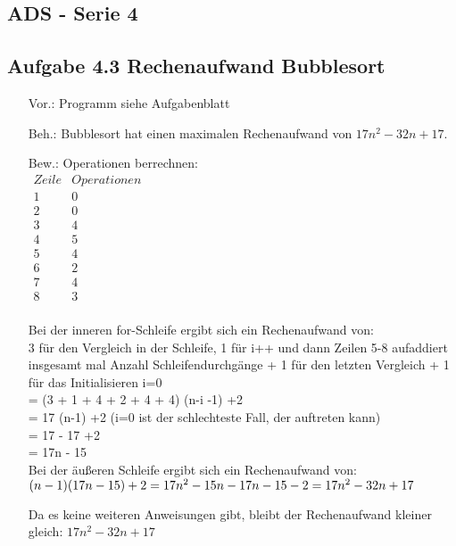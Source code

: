 \documentclass[12pt]{article}
\begin{document}
\subsection*{ADS - Serie 4}
\subsection*{Aufgabe 4.3 Rechenaufwand Bubblesort}
\begin{enumerate}
\item[Vor.:] Programm siehe Aufgabenblatt
\item[Beh.:]  Bubblesort hat einen maximalen Rechenaufwand von $17n^2 - 32n +17$.
\item[Bew.:] Operationen berrechnen:\\
$\begin{array}{l|l}
 Zeile &  Operationen \\
\hline
1 & 0 \\
2 & 0 \\
3 & 4 \\
4 & 5 \\
5 & 4 \\
6 & 2 \\
7 & 4 \\
8 & 3\\
\end{array}$

Bei der inneren for-Schleife ergibt sich ein Rechenaufwand von:\\
3 für den Vergleich in der Schleife, 1 für i++ und dann Zeilen 5-8 aufaddiert insgesamt mal Anzahl Schleifendurchgänge + 1 für den letzten Vergleich + 1 für das Initialisieren i=0\\
= (3 + 1 + 4 + 2 + 4 + 4)  (n-i -1) +2 \\
= 17 (n-1) +2 \quad (i=0 ist der schlechteste Fall, der auftreten kann)\\
= 17 - 17 +2 \\
= 17n - 15 \\

Bei der äußeren Schleife ergibt sich ein Rechenaufwand von:\\
$(n-1) (17n-15) + 2\\
= 17n^2 - 15n - 17n - 15 - 2 \\
= 17n^2 - 32n + 17 \\$

Da es keine weiteren Anweisungen gibt, bleibt der Rechenaufwand kleiner gleich: $17n^2 - 32n + 17$ 
\end{enumerate}
\end{document}

